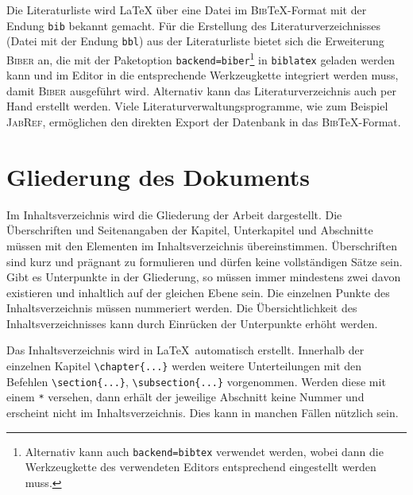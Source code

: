 Die Literaturliste wird \LaTeX{} über eine Datei im \textsc{Bib}\TeX{}-Format mit der Endung \texttt{bib} bekannt gemacht.
Für die Erstellung des Literaturverzeichnisses (Datei mit der Endung \texttt{bbl}) aus der Literaturliste bietet sich die Erweiterung \textsc{Biber} an, die mit der Paketoption \texttt{backend=biber}\footnote{\label{ftn:Fussnote1}Alternativ kann auch \texttt{backend=bibtex} verwendet werden, wobei dann die Werkzeugkette des verwendeten Editors entsprechend eingestellt werden muss.} in \texttt{biblatex} geladen werden kann und im Editor in die entsprechende Werkzeugkette integriert werden muss, damit \textsc{Biber} ausgeführt wird.
Alternativ kann das Literaturverzeichnis auch per Hand erstellt werden.
Viele Literaturverwaltungsprogramme, wie zum Beispiel \textsc{JabRef}, ermöglichen den direkten Export der Datenbank in das \textsc{Bib}\TeX{}-Format.


\section{Gliederung des Dokuments}
\label{sec:Latex-Gliederung}
Im Inhaltsverzeichnis wird die Gliederung der Arbeit dargestellt. Die Überschriften und Seitenangaben der Kapitel, Unterkapitel und Abschnitte müssen mit den Elementen im Inhaltsverzeichnis übereinstimmen. Überschriften sind kurz und prägnant zu formulieren und dürfen keine vollständigen Sätze sein. Gibt es Unterpunkte in der Gliederung, so müssen immer mindestens zwei davon existieren und inhaltlich auf der gleichen Ebene sein. Die einzelnen Punkte des Inhaltsverzeichnis müssen nummeriert werden. Die Übersichtlichkeit des Inhaltsverzeichnisses kann durch Einrücken der Unterpunkte erhöht werden.

Das Inhaltsverzeichnis wird in \LaTeX\ automatisch erstellt.
Innerhalb der einzelnen Kapitel \verb|\chapter{...}| werden weitere Unterteilungen mit den Befehlen \verb|\section{...}|, \verb|\subsection{...}| \usw vorgenommen.
Werden diese mit einem \verb|*| versehen, dann erhält der jeweilige Abschnitt keine Nummer und erscheint nicht im Inhaltsverzeichnis.
Dies kann in manchen Fällen nützlich sein.

